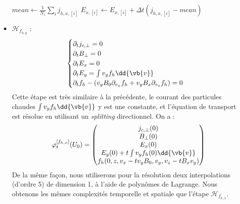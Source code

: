 \begin{itemize}
\begin{algorithm}
\begin{algorithmic}[1]
          \State $mean \gets \frac{1}{N_z}\sum_i j_{h,x,[i]}$
            \State $E_{x,[i]} \gets E_{x,[i]} + \Delta t(j_{h,x,[i]}-mean)$
          \EndFor
        \EndFunction

          \vspace{0.25cm}

          \State {}\label{alg:l:Hfhx:18}
          \State {}\label{alg:l:Hfhx:19}
        \EndFunction
      \end{algorithmic}
    \end{algorithm}

  \item $\mathcal{H}_{f_{h,y}}$ :
    $$
      \begin{cases}
        \partial_t j_{c,\perp} = 0 \\
        \partial_t B_{\perp} = 0 \\
        \partial_t E_{x} = 0 \\
        \partial_t E_{y} = \int v_yf_h\dd{\vb{v}} \\
        \partial_t f_h - (v_yB_0\partial_{v_x}f_h + v_yB_x\partial_{v_z}f_h) = 0
      \end{cases}
    $$
    Cette étape est très similaire à la précédente, le courant des particules chaudes $\int v_yf_h\dd{\vb{v}}$ y est une constante, et l'équation de transport est résolue en utilisant un \emph{splitting} directionnel. On a :
    $$
      \varphi_t^{[f_{h,x}]}(U_0) = \begin{pmatrix}
        j_{c,\perp}(0) \\
        B_{\perp}(0) \\
        E_x(0) \\
        E_y(0) + t\int v_yf_h(0)\dd{\vb{v}} \\
        f_h(0,z,v_x-tv_yB_0,v_y,v_z-tB_xv_y)
      \end{pmatrix}
    $$
    De la même façon, nous utiliserons pour la résolution deux interpolations (d'ordre 5) de dimension 1, à l'aide de polynômes de Lagrange. Nous obtenons les mêmes complexités temporelle et spatiale que l'étape $\mathcal{H}_{f_{h,x}}$.


\end{itemize}
